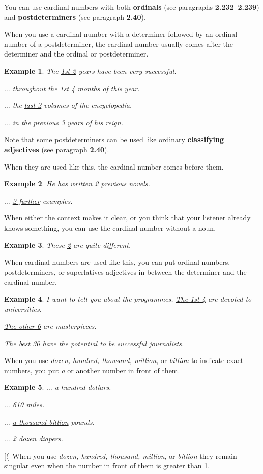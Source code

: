 \documentclass[oneside]{book}
\numberwithin{equation}{section}
\newtheorem{example}{Example}[section]
\begin{document}
%
\noindent{} You can use cardinal numbers with both \textbf{ordinals} (see paragraphs \textbf{2.232--2.239}) and \textbf{postdeterminers} (see paragraph \textbf{2.40}).

When you use a cardinal number with a determiner followed by an ordinal number of a postdeterminer, the cardinal number usually comes after the determiner and the ordinal or postdeterminer.
\begin{example}
    The \underline{1st 2} years have been very successful.
    
    $\ldots$ throughout the \underline{1st 4} months of this year.
    
    $\ldots$ the \underline{last 2} volumes of the encyclopedia.
    
    $\ldots$ in the \underline{previous 3} years of his reign.
\end{example}
Note that some postdeterminers can be used like ordinary \textbf{classifying adjectives} (see paragraph \textbf{2.40}).

When they are used like this, the cardinal number comes before them.
\begin{example}
    He has written \underline{2 previous} novels.
    
    $\ldots$ \underline{2 further} examples.
\end{example}
%
\noindent{} When either the context makes it clear, or you think that your listener already knows something, you can use the cardinal number without a noun.
\begin{example}
    These \underline{2} are quite different.
\end{example}
When cardinal numbers are used like this, you can put ordinal numbers, postdeterminers, or superlatives adjectives in between the determiner and the cardinal number.
\begin{example}
    I want to tell you about the programmes. \underline{The 1st 4} are devoted to universities.
    
    \underline{The other 6} are masterpieces.
    
    \underline{The best 30} have the potential to be successful journalists.
\end{example}
%
\noindent{} When you use \textit{dozen, hundred, thousand, million}, or \textit{billion} to indicate exact numbers, you put \textit{a} or another number in front of them.
\begin{example}
    $\ldots$ \underline{a hundred} dollars.
    
    $\ldots$ \underline{610} miles.
    
    $\ldots$ \underline{a thousand billion} pounds.
    
    $\ldots$ \underline{2 dozen} diapers.
\end{example}
%
\noindent{} [!] When you use \textit{dozen, hundred, thousand, million}, or \textit{billion} they remain singular even when the number in front of them is greater than 1.
\end{document}
